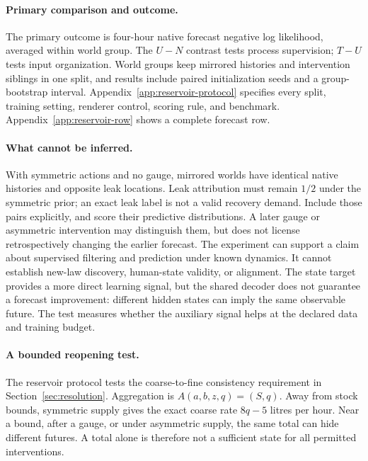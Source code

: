 \documentclass[10pt]{article}
\begin{document}
\paragraph{Primary comparison and outcome.}
The primary outcome is four-hour native forecast negative log likelihood,
averaged within world group. The $U-N$ contrast tests process supervision;
$T-U$ tests input organization. World groups keep mirrored histories and
intervention siblings in one split, and results include paired initialization
seeds and a group-bootstrap interval. Appendix~\ref{app:reservoir-protocol}
specifies every split, training setting, renderer control, scoring rule, and
benchmark. Appendix~\ref{app:reservoir-row} shows a complete forecast row.

\paragraph{What cannot be inferred.}
With symmetric actions and no gauge, mirrored worlds have identical native
histories and opposite leak locations. Leak attribution must remain $1/2$
under the symmetric prior; an exact leak label is not a valid recovery demand.
Include those pairs explicitly, and score their predictive distributions.
A later gauge or asymmetric intervention may distinguish them, but does not
license retrospectively changing the earlier forecast. The experiment can
support a claim about supervised filtering and prediction under known
dynamics. It cannot establish new-law discovery, human-state validity, or
alignment.
The state target provides a more direct learning signal, but the shared
decoder does not guarantee a forecast improvement: different hidden states
can imply the same observable future. The test measures whether the auxiliary
signal helps at the declared data and training budget.

\paragraph{A bounded reopening test.}
The reservoir protocol tests the coarse-to-fine consistency requirement in
Section~\ref{sec:resolution}. Aggregation is
$A(a,b,z,q)=(S,q)$. Away from stock bounds, symmetric supply gives the exact
coarse rate $8q-5$ litres per hour. Near a bound, after a gauge, or under
asymmetric supply, the same total can hide different futures. A total alone
is therefore not a sufficient state for all permitted interventions.
\end{document}
